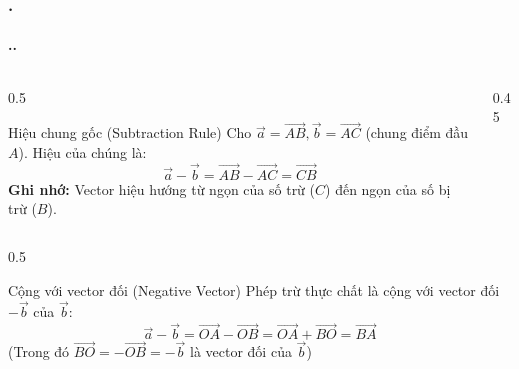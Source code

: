 \documentclass[11pt, aspectratio=169]{beamer}
\begin{document}
\begin{frame}[fragile]
    \frametitle{\thesection. \insertsection}
    \framesubtitle{\thesection.\thesubsection. \insertsubsection}

    \vspace{-0.3cm}

    \begin{columns}[c]
        \begin{column}{0.5\textwidth}
            \begin{block}{Hiệu chung gốc (Subtraction Rule)}
                \footnotesize
                Cho $\vec{a} = \vec{AB}, \vec{b} = \vec{AC}$ (chung điểm đầu $A$). Hiệu của chúng là:
                \[ \vec{a} - \vec{b} = \vec{AB} - \vec{AC} = \vec{CB} \]
                \textbf{Ghi nhớ:} Vector hiệu hướng từ ngọn của số trừ ($C$) đến ngọn của số bị trừ ($B$).
            \end{block}
        \end{column}
        
        \begin{column}{0.45\textwidth}
            \centering
            \vspace{0.3cm}
        \end{column}
    \end{columns}

    \begin{columns}[c]
    \begin{column}{0.5\textwidth}
        \begin{block}{Cộng với vector đối (Negative Vector)}
            \footnotesize
            Phép trừ thực chất là cộng với vector đối $-\vec{b}$ của $\vec{b}$:
            \[ \vec{a} - \vec{b} = \vec{OA} - \vec{OB} = \vec{OA} + \vec{BO} = \vec{BA} \]
            (Trong đó $\vec{BO} = -\vec{OB} = -\vec{b}$ là vector đối của $\vec{b}$)
        \end{block}
    \end{column}
    

\end{columns}
\end{frame}
\end{document}
